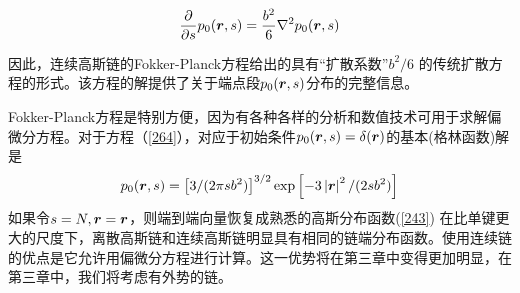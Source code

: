 \begin{equation}\label{264}
\frac{\partial}{\partial s}p_0(\bm{r} ,s)=\frac{b^2}{6}\nabla ^2 p_0(\bm{r} ,s) 
\end{equation}

因此，连续高斯链的Fokker-Planck方程给出的具有“扩散系数”$b^2/6$
的传统扩散方程的形式。该方程的解提供了关于端点段$p_0(\bm{r} ,s)$分布的完整信息。

Fokker-Planck方程是特别方便，因为有各种各样的分析和数值技术可用于求解偏微分方程。对于方程（\ref{264}），对应于初始条件$p_0(\bm{r} ,s)=\delta(\bm{r} )$的基本(格林函数)解是
\begin{equation}\label{265}
p_0(\bm{r} ,s)=\left[ 3/(2 \pi sb^2) \right]^{3/2}\exp \left[ -3\left| \bm{r}  \right|^2/(2sb^2) \right]
\end{equation}
如果令$s=N,\bm{r} =\bm{r} $，则端到端向量恢复成熟悉的高斯分布函数(\ref{243})
在比单键更大的尺度下，离散高斯链和连续高斯链明显具有相同的链端分布函数。使用连续链的优点是它允许用偏微分方程进行计算。这一优势将在第三章中变得更加明显，在第三章中，我们将考虑有外势的链。
\endinput